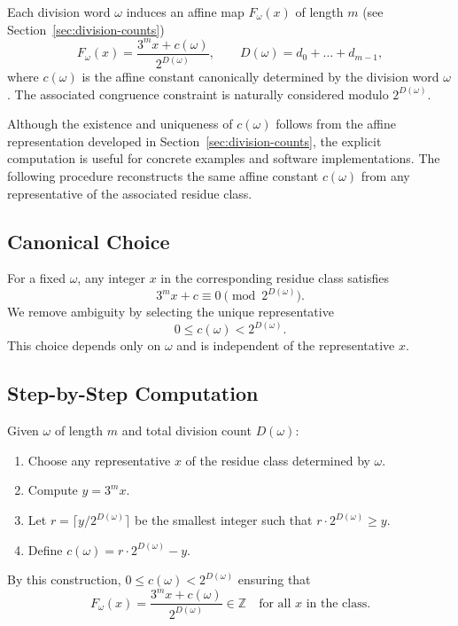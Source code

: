 \documentclass[12pt, oneside]{article}
\numberwithin{equation}{section}
\theoremstyle{definition}
\theoremstyle{plain}
\theoremstyle{remark}
\begin{document}
Each division word \(\omega\) induces an affine map \(F_\omega(x)\) of length $m$
(see Section~\ref{sec:division-counts})
\[
F_\omega(x) = \frac{3^m x + c(\omega)}{2^{D(\omega)}}, \qquad D(\omega) = d_0 + \dots + d_{m-1},
\]
where \(c(\omega)\) is the affine constant canonically determined by the
division word \(\omega\).  The associated congruence constraint is naturally
considered modulo \(2^{D(\omega)}\).

Although the existence and uniqueness of \(c(\omega)\) follows from the affine representation
developed in Section~\ref{sec:division-counts}, the explicit computation is useful for concrete
examples and software implementations. The following procedure reconstructs the same affine
constant \(c(\omega)\) from any representative of the associated residue class.

\subsection{Canonical Choice}

For a fixed \(\omega\), any integer \(x\) in the corresponding residue class satisfies
\[
3^m x + c \equiv 0 \pmod{2^{D(\omega)}}.
\]
We remove ambiguity by selecting the unique representative
\[
0 \le c(\omega) < 2^{D(\omega)}.
\]
This choice depends only on \(\omega\) and is independent of the representative \(x\).

\subsection{Step-by-Step Computation}

Given \(\omega\) of length \(m\) and total division count \(D(\omega)\):

\begin{enumerate}
\item Choose any representative \(x\) of the residue class determined by \(\omega\).  
\item Compute \(y = 3^m x\).  
\item Let \(r = \lceil y / 2^{D(\omega)} \rceil\) be the smallest integer such that \(r \cdot 2^{D(\omega)} \ge y\).  
\item Define \(c(\omega) = r \cdot 2^{D(\omega)} - y\).  
\end{enumerate}

By this construction, \(0 \le c(\omega) < 2^{D(\omega)}\) ensuring that
\[
F_\omega(x) = \frac{3^m x + c(\omega)}{2^{D(\omega)}} \in \mathbb{Z} \quad \text{for all } x \text{ in the class.}
\]
\end{document}
